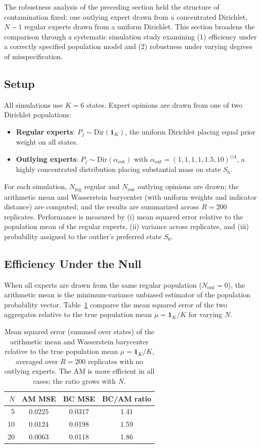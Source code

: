 The robustness analysis of the preceding section held the structure of contamination fixed: one outlying expert drawn from a concentrated Dirichlet, $N-1$ regular experts drawn from a uniform Dirichlet.  This section broadens the comparison through a systematic simulation study examining (1) efficiency under a correctly specified population model and (2) robustness under varying degrees of misspecification.

\subsection{Setup}

All simulations use $K=6$ states.  Expert opinions are drawn from one of two Dirichlet populations:
\begin{itemize}
    \item \textbf{Regular experts}: $P_j \sim \mathrm{Dir}(\mathbf{1}_K)$, the uniform Dirichlet placing equal prior weight on all states.
    \item \textbf{Outlying experts}: $P_j \sim \mathrm{Dir}(\alpha_{\mathrm{out}})$ with $\alpha_{\mathrm{out}} = (1,1,1,1,1.5,10)^{\odot 4}$, a highly concentrated distribution placing substantial mass on state $S_6$.
\end{itemize}
For each simulation, $N_{\mathrm{reg}}$ regular and $N_{\mathrm{out}}$ outlying opinions are drawn; the arithmetic mean and Wasserstein barycenter (with uniform weights and indicator distance) are computed; and the results are summarized across $R = 200$ replicates.  Performance is measured by (i) mean squared error relative to the population mean of the regular experts, (ii) variance across replicates, and (iii) probability assigned to the outlier's preferred state $S_6$.

\subsection{Efficiency Under the Null}

When all experts are drawn from the same regular population ($N_{\mathrm{out}} = 0$), the arithmetic mean is the minimum-variance unbiased estimator of the population probability vector.  Table~\ref{tab:efficiency} compares the mean squared error of the two aggregates relative to the true population mean $\mu = \mathbf{1}_K / K$ for varying $N$.

\begin{table}[ht]
\centering
\begin{tabular}{rccc}
\hline
$N$ & AM MSE & BC MSE & BC/AM ratio \\
\hline
5  & 0.0225 & 0.0317 & 1.41 \\
10 & 0.0124 & 0.0198 & 1.59 \\
20 & 0.0063 & 0.0118 & 1.86 \\
\hline
\end{tabular}
\caption{Mean squared error (summed over states) of the arithmetic mean and Wasserstein barycenter relative to the true population mean $\mu = \mathbf{1}_K/K$, averaged over $R=200$ replicates with no outlying experts.  The AM is more efficient in all cases; the ratio grows with $N$.}
\label{tab:efficiency}
\end{table}

